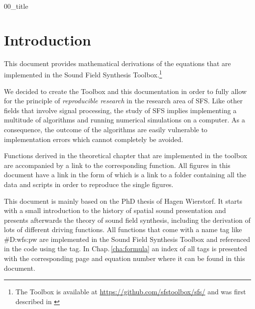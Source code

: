 \documentclass[a4paper]{book}
\newcommand{\reproduce}[1]{%
    \href{#1}{\color{link}\large\Pointinghand}%
}%
\def \GITHUBBASE {http://github.com/sfstoolbox/sfs-documentation/tree/master}%
\def \PATH {.}                                                    %
\begin{document}
\let\cleardoublepage\clearpage

{00_title}

\tableofcontents

\chapter{Introduction}
\label{cha:introduction}
%
This document provides mathematical derivations of the equations that are
implemented in the Sound Field Synthesis Toolbox.\footnote{The Toolbox is
available at
\href{https://github.com/sfstoolbox/sfs/}{\color{link}https://github.com/sfstoolbox/sfs/}
and was first described in
\cite{Wierstorf2012a}}

We decided to create the Toolbox and this documentation in order to fully allow
for the principle of \emph{reproducible research}\cite{Donoho2009} in the
research area of SFS.
Like other fields that involve signal processing, the study of SFS
implies implementing a multitude of algorithms and running numerical simulations
on a computer.
As a consequence, the outcome of the algorithms are easily vulnerable to
implementation errors which cannot completely be
avoided.\cite[Compare][]{Ince2012}

Functions derived in the theoretical chapter that are implemented in the
toolbox are accompanied by a link to the corresponding function. All figures in
this document have a link in the form of \reproduce{\GITHUBBASE} which is a link to a
folder containing all the data and scripts in order to reproduce the single
figures.

This document is mainly based on the PhD thesis of Hagen
Wierstorf.\cite{Wierstorf2014} It starts with a small introduction to the
history of spatial sound presentation and presents afterwards the theory of
sound field synthesis, including the derivation of lots of different driving
functions. All functions that come with a name tag like \#D:wfs:pw are
implemented in the Sound Field Synthesis Toolbox and referenced in the code
using the tag. In Chap.\,\ref{cha:formula} an index of all tags is presented
with the corresponding page and equation number where it can be found in this
document.


\end{document}
